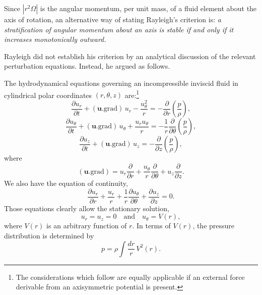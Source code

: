 Since $|r^2\Omega|$ is the angular momentum, per unit mass, of a fluid element
about the axis of rotation, an alternative way of stating Rayleigh's
criterion is: \emph{a stratification of angular momentum about an axis is stable if
and only if it increases monotonically outward.}

Rayleigh did not establish his criterion by an analytical discussion of
the relevant perturbation equations.  Instead, he argued as follows.

The hydrodynamical equations governing an incompressible inviscid
fluid in cylindrical polar coordinates $(r,\theta,z)$ are:\footnote{The considerations which follow are equally applicable if an external force derivable
from an axisymmetric potential is present.}
\begin{equation}
\label{eq:7-6}
\frac{\partial u_r}{\partial t} + (\mathbf{u}.\mathrm{grad})\,u_r - \frac{u_\theta^2}{r}
= -\frac{\partial}{\partial r}\!\left(\frac{p}{\rho}\right),
\end{equation}
\begin{equation}
\label{eq:7-7}
\frac{\partial u_\theta}{\partial t} + (\mathbf{u}.\mathrm{grad})\,u_\theta + \frac{u_r u_\theta}{r}
= -\frac{1}{r}\frac{\partial}{\partial \theta}\!\left(\frac{p}{\rho}\right),
\end{equation}
\begin{equation}
\label{eq:7-8}
\frac{\partial u_z}{\partial t} + (\mathbf{u}.\mathrm{grad})\,u_z
= -\frac{\partial}{\partial z}\!\left(\frac{p}{\rho}\right),
\end{equation}
where
\begin{equation}
\label{eq:7-9}
(\mathbf{u}.\mathrm{grad}) = u_r \frac{\partial}{\partial r}
+ \frac{u_\theta}{r}\frac{\partial}{\partial \theta}
+ u_z \frac{\partial}{\partial z}.
\end{equation}
We also have the equation of continuity,
\begin{equation}
\label{eq:7-10}
\frac{\partial u_r}{\partial r}
+ \frac{u_r}{r}
+ \frac{1}{r}\frac{\partial u_\theta}{\partial \theta}
+ \frac{\partial u_z}{\partial z} = 0.
\end{equation}
Those equations clearly allow the stationary solution,
\begin{equation}
\label{eq:7-11}
u_r = u_z = 0 \quad \text{and} \quad u_\theta = V(r),
\end{equation}
where $V(r)$ is an arbitrary function of $r$.  In terms of $V(r)$, the pressure
distribution is determined by
\begin{equation}
\label{eq:7-12}
p = \rho \int \frac{dr}{r}\, V^2(r).
\end{equation}

